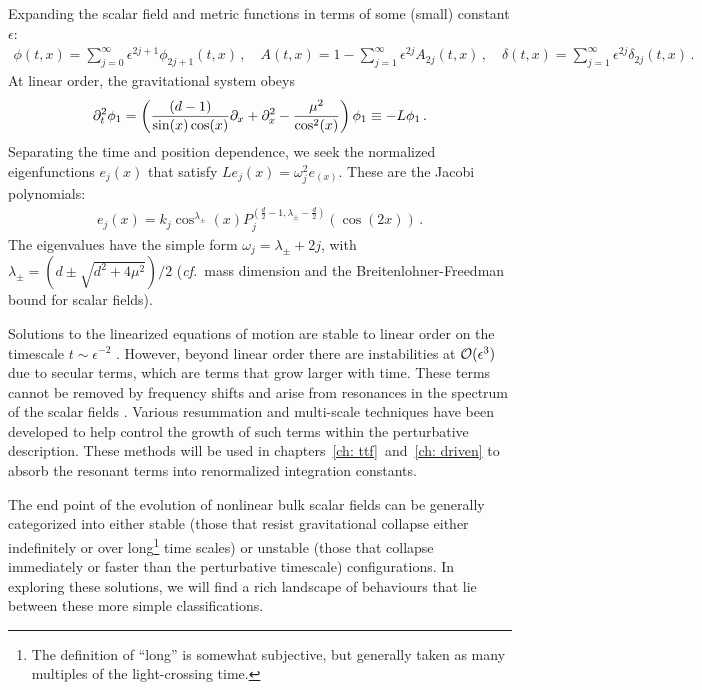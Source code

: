 \documentclass[../PhD.tex]{subfiles}
\begin{document}
Expanding the scalar field and metric functions in terms of some (small) constant $\epsilon$:
\begin{align}
\phi(t,x) = \sum_{j=0}^{\infty} \epsilon^{2j + 1} \phi_{2j + 1} (t,x) \, , \quad A(t,x) = 1 - \sum_{j=1}^\infty \epsilon^{2j} A_{2j} (t,x) \, , \quad \delta(t,x) = \sum_{j=1}^\infty \epsilon^{2j} \delta_{2j} (t,x) \, .
\end{align}
At linear order, the gravitational system obeys
\begin{align}
\label{collapse eigen eqn}
\partial_t^2 \phi_1 = \left( \frac{ (d-1)}{\sin (x) \cos (x)} \partial_x + \partial^2_x - \frac{\mu^2}{\cos^2 (x)} \right) \phi_1 \equiv - L \phi_1 \, .
\end{align}
Separating the time and position dependence, we seek the normalized eigenfunctions $e_j(x)$ that satisfy $L e_j(x) = \omega_j^2 e_(x)$. These are the Jacobi polynomials:
\begin{align}
\label{scalar eigens}
e_j (x) = k_j \cos^{\lambda_\pm}(x) P_j^{(\frac{d}{2} - 1, \lambda_\pm - \frac{d}{2})} \left( \cos \left( 2x \right)\right) \, .
\end{align}
The eigenvalues have the simple form $\omega_j = \lambda_\pm + 2j$, with $\lambda_\pm = (d \pm \sqrt{d^2 + 4\mu^2})/2$ ({\it cf.}~mass dimension and the Breitenlohner-Freedman bound for scalar fields). 

Solutions to the linearized equations of motion are stable to linear order on the timescale $t \sim \epsilon^{-2}$ \cite{1506.07907}. However, beyond linear order there are instabilities at $\mathcal O(\epsilon^3)$ due to secular terms, which are terms that grow larger with time. These terms cannot be removed by frequency shifts and arise from resonances in the spectrum of the scalar fields \cite{1407.6273}. Various resummation \cite{hep-th/9506161} and multi-scale techniques \cite{1403.6471} have been developed to help control the growth of such terms within the perturbative description. These methods will be used in chapters~\ref{ch: ttf}~and~\ref{ch: driven} to absorb the resonant terms into renormalized integration constants.

The end point of the evolution of nonlinear bulk scalar fields can be generally categorized into either stable (those that resist gravitational collapse either indefinitely or over long\footnote{The definition of ``long'' is somewhat subjective, but generally taken as many multiples of the light-crossing time.} time scales) or unstable (those that collapse immediately or faster than the perturbative timescale) configurations. In exploring these solutions, we will find a rich landscape of behaviours that lie between these more simple classifications.
\end{document}
